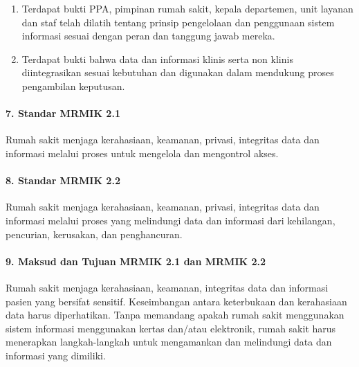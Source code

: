 \documentclass[
]{book}
\providecommand{\tightlist}{%
  \setlength{\itemsep}{0pt}\setlength{\parskip}{0pt}}
\begin{document}
\begin{enumerate}
\def\labelenumi{\alph{enumi}.}
\tightlist
\item
  Terdapat bukti PPA, pimpinan rumah sakit, kepala departemen, unit layanan dan staf telah dilatih tentang prinsip pengelolaan dan penggunaan sistem informasi sesuai dengan peran dan tanggung jawab mereka.
\item
  Terdapat bukti bahwa data dan informasi klinis serta non klinis diintegrasikan sesuai kebutuhan dan digunakan dalam mendukung proses pengambilan keputusan.
\end{enumerate}

\hypertarget{standar-mrmik-2.1}{%
\paragraph*{7. Standar MRMIK 2.1}\label{standar-mrmik-2.1}}

Rumah sakit menjaga kerahasiaan, keamanan, privasi, integritas data dan informasi melalui proses untuk mengelola dan mengontrol akses.

\hypertarget{standar-mrmik-2.2}{%
\paragraph*{8. Standar MRMIK 2.2}\label{standar-mrmik-2.2}}

Rumah sakit menjaga kerahasiaan, keamanan, privasi, integritas data dan informasi melalui proses yang melindungi data dan informasi dari kehilangan, pencurian, kerusakan, dan penghancuran.

\hypertarget{maksud-dan-tujuan-mrmik-2.1-dan-mrmik-2.2}{%
\paragraph*{9. Maksud dan Tujuan MRMIK 2.1 dan MRMIK 2.2}\label{maksud-dan-tujuan-mrmik-2.1-dan-mrmik-2.2}}

Rumah sakit menjaga kerahasiaan, keamanan, integritas data dan informasi pasien yang bersifat sensitif. Keseimbangan antara keterbukaan dan kerahasiaan data harus diperhatikan. Tanpa memandang apakah rumah sakit menggunakan sistem informasi menggunakan kertas dan/atau elektronik, rumah sakit harus menerapkan langkah-langkah untuk mengamankan dan melindungi data dan informasi yang dimiliki.
\end{document}
